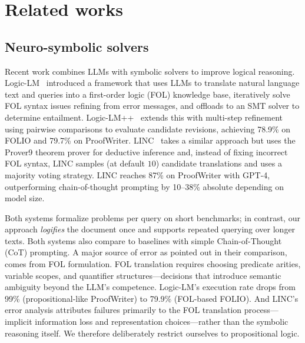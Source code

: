 \documentclass{article} %
\begin{document}
\section{Related works}

\subsection{Neuro-symbolic solvers}
Recent work combines LLMs with symbolic solvers to improve logical reasoning.
Logic-LM~\citep{pan2023logiclm} introduced a framework that uses LLMs to translate natural language text and queries into a first-order logic (FOL) knowledge base, iteratively solve FOL syntax issues refining from error messages, and offloads to an SMT solver to determine entailment. Logic-LM++~\citep{parmar2024logiclmpp} extends this with multi-step refinement using pairwise comparisons to evaluate candidate revisions, achieving 78.9\% on FOLIO and 79.7\% on ProofWriter.
LINC~\citep{olausson2023linc} takes a similar approach but uses the Prover9 
theorem prover for deductive inference and, instead of fixing incorrect FOL 
syntax, LINC samples (at default $10$) candidate translations and uses a majority voting strategy. LINC reaches 87\% on ProofWriter with GPT-4, outperforming chain-of-thought prompting by 10--38\% absolute depending on model size.

Both systems formalize problems per query on short benchmarks; in contrast, our approach \emph{logifies} the document once and supports repeated querying over longer texts. 
Both systems also compare to baselines with simple Chain-of-Thought (CoT) prompting. A major source of error as pointed out in their comparison, comes from FOL formulation. FOL translation requires choosing predicate arities, variable
scopes, and quantifier structures—decisions that introduce semantic
ambiguity beyond the LLM's competence. Logic-LM's execution rate drops from 99\% (propositional-like ProofWriter)
to 79.9\% (FOL-based FOLIO). 
And LINC's error analysis attributes failures primarily to the FOL translation process—implicit information loss and representation choices—rather than the symbolic reasoning itself.
We therefore deliberately restrict ourselves to propositional logic.
\end{document}
